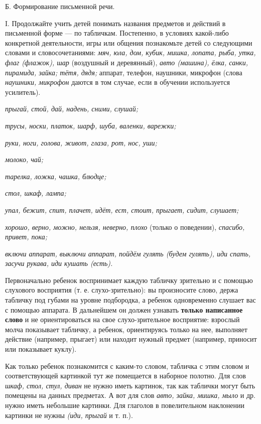 \documentclass[a5paper]{book}
\renewcommand{\emph}[1]{\textit{#1}}
\begin{document}
Б. Формирование письменной речи.

I. Продолжайте учить детей понимать названия предметов и действий в
письменной форме --- по табличкам. Постепенно, в условиях какой-либо
конкретной деятельности, игры или общения познакомьте детей со
следующими словами и словосочетаниями: \emph{мяч, юла, дом, кубик,
мишка, лопата, рыба, утка, флаг (флажок), шар} (воздушный и деревянный),
\emph{авто (машина), ёлка, санки, пирамида, зайка; тётя, дядя;} аппарат,
телефон, наушники, микрофон (слова \emph{наушники, микрофон} даются в
том случае, если в обучении используется усилитель).

\emph{прыгай, стой, дай, надень, сними, слушай;}

\emph{трусы, носки, платок, шарф, шуба, валенки, варежки;}

\emph{руки, ноги, голова, живот, глаза, рот, нос, уши;}

\emph{молоко, чай;}

\emph{тарелка, ложка, чашка, блюдце;}

\emph{стол, шкаф, лампа;}

\emph{упал, бежит, спит, плачет, идёт, ест, стоит, прыгает, сидит,
слушает;}

\emph{хорошо, верно, можно, нельзя, неверно, плохо} (только о
поведении), \emph{спасибо, привет, пока;}

\emph{включи аппарат, выключи аппарат, пойдём гулять (будем гулять), иди
спать, засучи рукава, иди кушать (есть).}

Первоначально ребенок воспринимает каждую табличку зрительно и с помощью
слухового восприятия (т. е. слухо-зрительно): вы произносите слово,
держа табличку под губами на уровне подбородка, а ребенок одновременно
слушает вас с помощью аппарата. В дальнейшем он должен узнавать
\textbf{только написанное слово} и не ориентироваться на свое
слухо-зрительное восприятие: взрослый молча показывает табличку, а
ребенок, ориентируясь только на нее, выполняет действие (например,
прыгает) или находит нужный предмет (например, приносит или показывает
куклу).

Как только ребенок познакомится с каким-то словом, табличка с этим
словом и соответствующей картинкой тут же помещается в наборное полотно.
Для слов \emph{шкаф, стол, стул, диван} не нужно иметь картинок, так как
таблички могут быть помещены на данных предметах. А вот для слов
\emph{авто, зайка, мишка, мыло} и др. нужно иметь небольшие картинки.
Для глаголов в повелительном наклонении картинки не нужны \emph{(иди,
прыгай} и т. п.).
\end{document}
